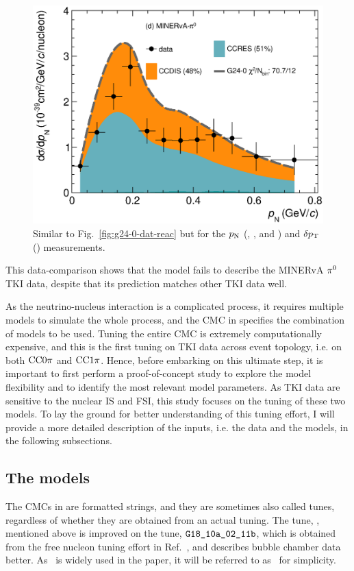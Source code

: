 \begin{figure}
    \includegraphics[width=\dbfigwid\textwidth]{figures/tuning/0000-min_pi0_pn_reac_decomp.eps}
    \caption{\label{fig:g24-0-pn-reac} Similar to Fig.~\ref{fig:g24-0-dat-reac} but for the $p_\textrm{N}$ (\ttkpip, \minzpi, and \minpiz) and $\delta p_\textrm{T}$ (\ttkzpi) measurements.
    } 
\end{figure}
This data-comparison shows that the model fails to describe the MINERvA $\pi^0$ TKI data, despite that its prediction matches other TKI data well.

As the neutrino-nucleus interaction is a complicated process, it requires multiple models to simulate the whole process, and the CMC in \genie specifies the combination of models to be used.
Tuning the entire CMC is extremely computationally expensive, and this is the first tuning on TKI data across event topology, i.e. on both $\textrm{CC}0\pi$ and $\textrm{CC}1\pi$. 
Hence, before embarking on this ultimate step, it is important to first perform a proof-of-concept study to explore the model flexibility and to identify the most relevant model parameters.
As TKI data are sensitive to the nuclear IS and FSI, this study focuses on the tuning of these two models.
To lay the ground for better understanding of this tuning effort, I will provide a more detailed description of the inputs, i.e. the data and the models, in the following subsections. 

\subsection{The models}
\label{sec:tuning-para-choice}
    The CMCs in \genie are formatted strings, and they are sometimes also called tunes, regardless of whether they are obtained from an actual tuning.
    The tune, \newtune, mentioned above is improved on the tune, $\texttt{G18\_10a\_02\_11b}$, which is obtained from the free nucleon tuning effort in Ref.~\cite{GENIE:2021zuu}, and describes bubble chamber data better.
    As \newtune\ is widely used in the paper, it will be referred to as \gZero\ for simplicity. 

